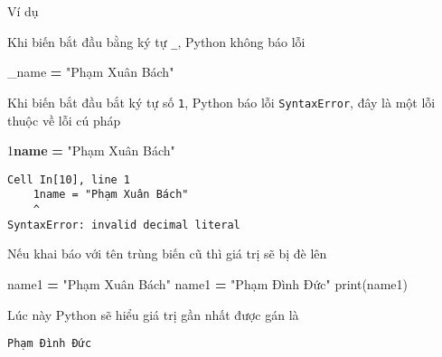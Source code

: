 \documentclass[
]{book}
\newenvironment{Shaded}{\begin{snugshade}}{\end{snugshade}}
\newcommand{\BuiltInTok}[1]{#1}
\newcommand{\DecValTok}[1]{\textcolor[rgb]{0.00,0.00,0.81}{#1}}
\newcommand{\ErrorTok}[1]{\textcolor[rgb]{0.64,0.00,0.00}{\textbf{#1}}}
\newcommand{\NormalTok}[1]{#1}
\newcommand{\OperatorTok}[1]{\textcolor[rgb]{0.81,0.36,0.00}{\textbf{#1}}}
\newcommand{\StringTok}[1]{\textcolor[rgb]{0.31,0.60,0.02}{#1}}
\begin{document}
Ví dụ

Khi biến bắt đầu bằng ký tự \texttt{\_}, Python không báo lỗi

\begin{Shaded}
\begin{Highlighting}[]
\NormalTok{\_name }\OperatorTok{=} \StringTok{"Phạm Xuân Bách"}
\end{Highlighting}
\end{Shaded}

Khi biến bắt đầu bắt ký tự số \texttt{1}, Python báo lỗi \texttt{SyntaxError}, đây là một lỗi thuộc về lỗi cú pháp

\begin{Shaded}
\begin{Highlighting}[]
\DecValTok{1}\ErrorTok{name} \OperatorTok{=} \StringTok{"Phạm Xuân Bách"}
\end{Highlighting}
\end{Shaded}

\begin{verbatim}
Cell In[10], line 1
    1name = "Phạm Xuân Bách"
    ^
SyntaxError: invalid decimal literal
\end{verbatim}

Nếu khai báo với tên trùng biến cũ thì giá trị sẽ bị đè lên

\begin{Shaded}
\begin{Highlighting}[]
\NormalTok{name1 }\OperatorTok{=} \StringTok{"Phạm Xuân Bách"}
\NormalTok{name1 }\OperatorTok{=} \StringTok{"Phạm Đình Đức"}
\BuiltInTok{print}\NormalTok{(name1)}
\end{Highlighting}
\end{Shaded}

Lúc này Python sẽ hiểu giá trị gần nhất được gán là

\begin{verbatim}
Phạm Đình Đức
\end{verbatim}

\printindex
\end{document}
